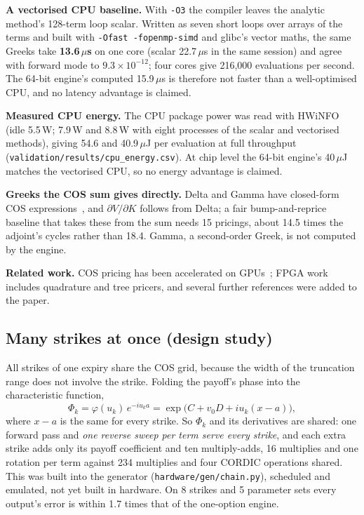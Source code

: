 \documentclass[11pt,a4paper]{article}
\begin{document}
\textbf{A vectorised CPU baseline.} With \texttt{-O3} the compiler leaves the analytic method's
128-term loop scalar. Written as seven short loops over arrays of the terms and built with
\texttt{-Ofast -fopenmp-simd} and glibc's vector maths, the same Greeks take \textbf{13.6\,$\mu$s}
on one core (scalar 22.7\,$\mu$s in the same session) and agree with forward mode to
$9.3\times10^{-12}$; four cores give 216,000 evaluations per second. The 64-bit engine's computed
15.9\,$\mu$s is therefore not faster than a well-optimised CPU, and no latency advantage is claimed.

\textbf{Measured CPU energy.} The CPU package power was read with HWiNFO (idle 5.5\,W; 7.9\,W and
8.8\,W with eight processes of the scalar and vectorised methods), giving 54.6 and 40.9\,$\mu$J per
evaluation at full throughput (\texttt{validation/results/cpu\_energy.csv}). At chip level the
64-bit engine's 40\,$\mu$J matches the vectorised CPU, so no energy advantage is claimed.

\textbf{Greeks the COS sum gives directly.} Delta and Gamma have closed-form COS
expressions~\cite{fang,junike}, and $\partial V/\partial K$ follows from Delta; a fair
bump-and-reprice baseline that takes these from the sum needs 15 pricings, about 14.5 times the
adjoint's cycles rather than 18.4. Gamma, a second-order Greek, is not computed by the engine.

\textbf{Related work.} COS pricing has been accelerated on GPUs~\cite{zhang}; FPGA work
includes quadrature and tree pricers, and several further references were added to the paper.

\subsection{Many strikes at once (design study)}
\label{sec:chain}
All strikes of one expiry share the COS grid, because the width of the truncation
range does not involve the strike. Folding the payoff's phase into the characteristic
function,
\[
  \Phi_k = \varphi(u_k)\,e^{-iu_k a} = \exp\!\big(C + v_0 D + iu_k(x-a)\big),
\]
where $x-a$ is the same for every strike. So $\Phi_k$ and its derivatives are shared:
one forward pass and \emph{one reverse sweep per term serve every strike}, and each
extra strike adds only its payoff coefficient and ten multiply-adds, 16 multiplies and
one rotation per term against 234 multiplies and four CORDIC operations shared. This
was built into the generator (\texttt{hardware/gen/chain.py}), scheduled and emulated,
not yet built in hardware. On 8 strikes and 5 parameter sets every output's error is
within 1.7 times that of the one-option engine.
\end{document}
